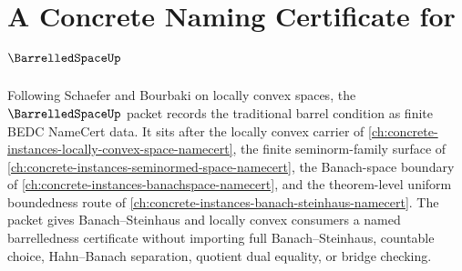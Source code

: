 \chapter{A Concrete Naming Certificate for $\BarrelledSpaceUp$}
\label{ch:concrete-instances-barrelled-space-namecert}

Following Schaefer and Bourbaki on locally convex spaces, the $\BarrelledSpaceUp$ packet records the traditional barrel condition as finite BEDC NameCert data. It sits after the locally convex carrier of \autoref{ch:concrete-instances-locally-convex-space-namecert}, the finite seminorm-family surface of \autoref{ch:concrete-instances-seminormed-space-namecert}, the Banach-space boundary of \autoref{ch:concrete-instances-banachspace-namecert}, and the theorem-level uniform boundedness route of \autoref{ch:concrete-instances-banach-steinhaus-namecert}. The packet gives Banach--Steinhaus and locally convex consumers a named barrelledness certificate without importing full Banach--Steinhaus, countable choice, Hahn--Banach separation, quotient dual equality, or bridge checking.

